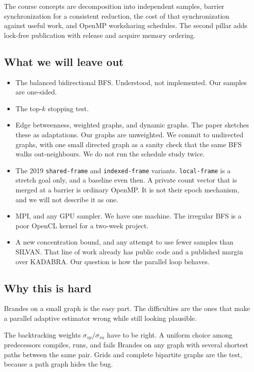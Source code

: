 \documentclass[11pt]{article}
\begin{document}
\begin{enumerate}
\end{enumerate}

The course concepts are decomposition into independent samples, barrier synchronization for a consistent reduction, the cost of that synchronization against useful work, and OpenMP worksharing schedules. The second pillar adds lock-free publication with release and acquire memory ordering.

\subsection{What we will leave out}

\begin{itemize}
\item The balanced bidirectional BFS. Understood, not implemented. Our samples are one-sided.
\item The top-$k$ stopping test.
\item Edge betweenness, weighted graphs, and dynamic graphs. The paper sketches these as adaptations. Our graphs are unweighted. We commit to undirected graphs, with one small directed graph as a sanity check that the same BFS walks out-neighbours. We do not run the schedule study twice.
\item The 2019 \texttt{shared-frame} and \texttt{indexed-frame} variants. \texttt{local-frame} is a stretch goal only, and a baseline even then. A private count vector that is merged at a barrier is ordinary OpenMP. It is not their epoch mechanism, and we will not describe it as one.
\item MPI, and any GPU sampler. We have one machine. The irregular BFS is a poor OpenCL kernel for a two-week project.
\item A new concentration bound, and any attempt to use fewer samples than SILVAN. That line of work already has public code and a published margin over KADABRA. Our question is how the parallel loop behaves.
\end{itemize}

\subsection{Why this is hard}

Brandes on a small graph is the easy part. The difficulties are the ones that make a parallel adaptive estimator wrong while still looking plausible.

The backtracking weights $\sigma_{sp}/\sigma_{su}$ have to be right. A uniform choice among predecessors compiles, runs, and fails Brandes on any graph with several shortest paths between the same pair. Grids and complete bipartite graphs are the test, because a path graph hides the bug.
\end{document}
